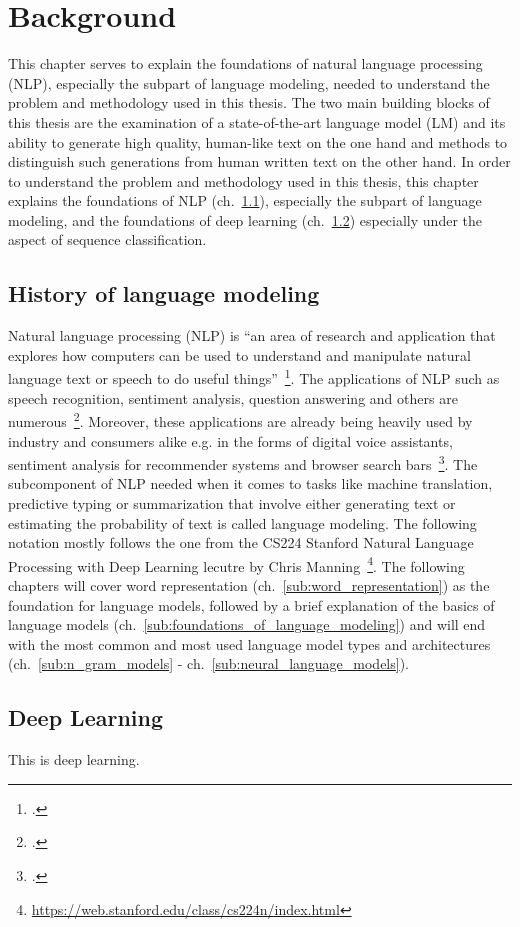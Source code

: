 \section{Background}
\label{ch:background}

This chapter serves to explain the foundations of natural language processing (NLP), especially the subpart of
language modeling, needed to understand the problem and methodology used in this thesis. The two main building blocks
of this thesis are the examination of a state-of-the-art language model (LM) and its ability to generate high quality,
human-like text on the one hand and methods to distinguish such generations from human written text on the other hand.
In order to understand the problem and methodology used in this thesis, this chapter explains the foundations
of NLP (ch.~\ref{sec:history_of_language_modeling}), especially the subpart of language
modeling, and the foundations of deep learning (ch.~\ref{sec:deep_learning}) especially under the aspect of sequence
classification.

\subsection{History of language modeling}
\label{sec:history_of_language_modeling}

Natural language processing (NLP) is “an area of research and application that explores how computers can be used to
understand and manipulate natural language text or speech to do useful things”~\footcite{doi:10.1002/aris.1440370103}.
The applications of NLP such as speech recognition, sentiment analysis,
question answering and others are numerous~\footcite{DBLP:journals/corr/GattK17}.
Moreover, these applications are already being heavily used by industry and
consumers alike e.g. in the forms of digital voice assistants, sentiment analysis for recommender systems
and browser search bars~\footcite{8012330,10.1145/3064663.3064672,GoogleSearch}. The subcomponent of NLP
needed when it comes to tasks like machine translation, predictive typing or summarization that involve either
generating text or estimating the probability of text is called language modeling. The following notation mostly
follows the one from the CS224 Stanford Natural Language Processing with Deep Learning lecutre by Chris Manning~\footnote{\url{https://web.stanford.edu/class/cs224n/index.html}}. The following chapters will cover word representation (ch.~\ref{sub:word_representation}) as the foundation for language models, followed by a brief explanation of the basics of language models (ch.~\ref{sub:foundations_of_language_modeling}) and will end with the most common and most used language model types and architectures (ch.~\ref{sub:n_gram_models} - ch.~\ref{sub:neural_language_models}).









\subsection{Deep Learning}
\label{sec:deep_learning}

This is deep learning.
